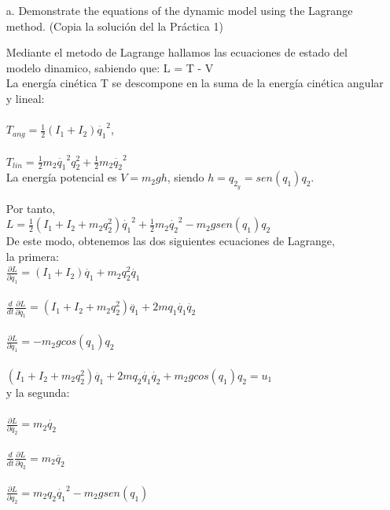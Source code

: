 \documentclass{article}
\begin{document}
\begin{itemize}

\item[a.] 
{\color{gray}
Demonstrate the equations of the dynamic model using the Lagrange method. (Copia la soluci\'on del la Pr\'actica 1)
}

\bigskip

Mediante el metodo de Lagrange hallamos las ecuaciones de estado del modelo dinamico, sabiendo que: L = T - V\\

La energía cinética T se descompone en la suma de la energía cinética angular y lineal:\\\\
$T_{ang} = \frac{1}{2}(I_1 + I_2)\dot{q_1}^2$,\\\\

$T_{lin} = \frac{1}{2}m_2\dot{q_1}^2q_2^2 + \frac{1}{2}m_2\dot{q_2}^2$\\

La energía potencial es $V = m_2gh$, siendo $h = q_2_y = sen(q_1)q_2$.

Por tanto,\\

$L = \frac{1}{2}(I_1 + I_2 + m_2q_2^2)\dot{q_1}^2 + \frac{1}{2}m_2\dot{q_2}^2 - m_2gsen(q_1)q_2$\\

De este modo, obtenemos las dos siguientes ecuaciones de Lagrange,\\
la primera:\\

		$\frac{\partial L}{\partial \dot{q_1}} = (I_1 + I_2)\dot{q_1} + m_2q_2^2\dot{q_1}$\\\\
		$\frac{d}{dt}\frac{\partial L}{\partial \dot{q_1}} = (I_1 + I_2 + m_2q_2^2)\ddot{q_1} + 2mq_1\dot{q_1}\dot{q_2}$\\\\
		$\frac{\partial L}{\partial q_1} = -m_2gcos(q_1)q_2$\\\\
		
		$(I_1 + I_2 + m_2q_2^2)\ddot{q_1} + 2mq_2\dot{q_1}\dot{q_2} + m_2gcos(q_1)q_2 = u_1$\\
		
y la segunda:\\\\
		$\frac{\partial L}{\partial \dot{q_2}} = m_2\dot{q_2}$\\\\
		$\frac{d}{dt}\frac{\partial L}{\partial \dot{q_2}} = m_2\ddot{q_2}$\\\\
		$\frac{\partial L}{\partial q_2} = m_2q_2\dot{q_1}^2 - m_2gsen(q_1)$\\\\
		

\end{itemize}
\end{document}
